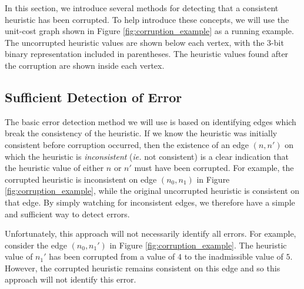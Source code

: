 \documentclass[letterpaper]{article}
\begin{document}
In this section, we introduce several methods for detecting that a consistent heuristic has been corrupted.
To help introduce these concepts, we will use the unit-cost graph shown in Figure \ref{fig:corruption_example} as a running example.
The uncorrupted heuristic values are shown below each vertex, with the 3-bit binary representation included in parentheses. The heuristic values found after the corruption are shown inside each vertex.

\subsection{Sufficient Detection of Error}

The basic error detection method we will use is based on identifying edges which break the consistency of the heuristic.
If we know the heuristic was initially consistent before corruption occurred, then the existence of an edge $(n, n')$ on which the heuristic is \textit{inconsistent} (\textit{ie.} not consistent) is a clear indication that the heuristic value of either $n$ or $n'$ must have been corrupted.
For example, the corrupted heuristic is inconsistent on edge $(n_0, n_1)$ in Figure \ref{fig:corruption_example}, while the original uncorrupted heuristic is consistent on that edge.
By simply watching for inconsistent edges, we therefore have a simple and sufficient way to detect errors.

Unfortunately, this approach will not necessarily identify all errors.
For example, consider the edge $(n_0, n_1')$ in Figure \ref{fig:corruption_example}.
The heuristic value of $n_1'$ has been corrupted from a value of $4$ to the inadmissible value of $5$.
However, the corrupted heuristic remains consistent on this edge and so this approach will not identify this error.





\end{document}
